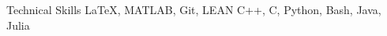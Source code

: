 \begin{rubric}{Technical Skills}
    \entry*[Software] \LaTeX, MATLAB, Git, LEAN%
	\entry*[Programming] C++, C, Python, Bash, Java, Julia%
\end{rubric}